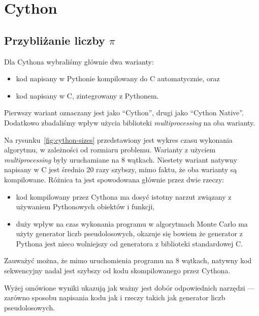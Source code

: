 \section{Cython}

\subsection{Przybliżanie liczby $\pi$}

\begin{figure*}
    \centering
    
    \caption{Czas wykonania algorytmu w Cythonie w zależności od rozmiaru problemu}
    \label{fig:cython-sizes}
\end{figure*}

Dla Cythona wybraliśmy głównie dwa warianty:
\begin{itemize}
    \item kod napisany w Pythonie kompilowany do C automatycznie, oraz
    \item kod napisany w C, zintegrowany z Pythonem.
\end{itemize}
Pierwszy wariant oznaczany jest jako ``Cython'', drugi jako ``Cython Native''.
Dodatkowo zbadaliśmy wpływ użycia biblioteki \textit{multiprocessing}
na oba warianty.

Na rysunku~\ref{fig:cython-sizes} przedstawiony jest wykres czasu wykonania
algorytmu, w zależności od rozmiaru problemu.
Warianty z użyciem \textit{multiprocessing} były uruchamiane na
8 wątkach.
Niestety wariant natywny napisany w C jest średnio 20 razy szybszy,
mimo faktu, że oba warianty są kompilowane.
Różnica ta jest spowodowana głównie przez dwie rzeczy:
\begin{itemize}
    \item kod kompilowany przez Cythona ma dosyć istotny narzut związany z
    używaniem Pythonowych obiektów i funkcji,
    \item duży wpływ na czas wykonania programu w algorytmach Monte Carlo
    ma użyty generator liczb pseudolosowych, okazuje się
    bowiem że generator z Pythona jest nieco wolniejszy od
    generatora z biblioteki standardowej C\@.
\end{itemize}
Zauważyć można, że mimo uruchomienia programu na 8 wątkach,
natywny kod sekwencyjny nadal jest szybszy od kodu skompilowanego przez
Cythona.

Wyżej omówione wyniki ukazują jak ważny jest dobór odpowiednich narzędzi
--- zarówno sposobu napisania kodu jak i rzeczy takich jak generator
liczb pseudolosowych.

